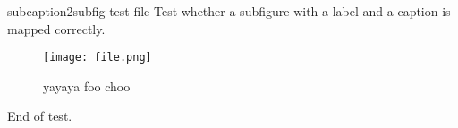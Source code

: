subcaption2subfig test file
Test whether a subfigure with a label and a caption is mapped correctly.

\begin{subfigure}
    \label{fig:somelabl}
    \caption{yayaya foo choo}
    \label{anotherlabel}
    \texttt{[image: file.png]}
\end{subfigure}

End of test.

